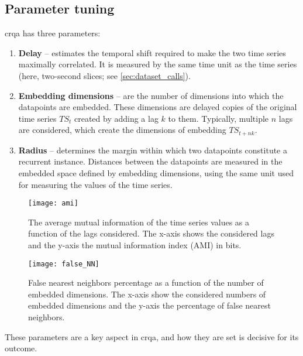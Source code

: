 \subsection{Parameter tuning}
\label{subsec:parameters_crqa}

\Ac{crqa} has three parameters:

\begin{enumerate}
	\item \textbf{Delay} -- estimates the temporal shift required to make the two time series maximally correlated.
	It is measured by the same time unit as the time series (here, two-second slices; see \cref{sec:dataset_calls}).
	
	\item \textbf{Embedding dimensions} -- are the number of dimensions into which the datapoints are embedded.
	These dimensions are delayed copies of the original time series $TS_t$ created by adding a lag $k$ to them.
	Typically, multiple $n$ lags are considered, which create the dimensions of embedding $TS_{t + nk}$.
	
	\item \textbf{Radius} -- determines the margin within which two datapoints constitute a recurrent instance.
	Distances between the datapoints are measured in the embedded space defined by embedding dimensions, using the same unit used for measuring the values of the time series.
\end{enumerate}
%
\begin{figure}
	\centering
	\begin{minipage}{.45\linewidth}
		\centering
		\texttt{[image: ami]}
		\caption[Average mutual information of time series as function of lag]
			{The average mutual information of the time series values as a function of the lags considered.
			The x-axis shows the considered lags and the y-axis the mutual information index (AMI) in bits.}
		\label{fig:ami}
	\end{minipage}%
	\hfill
	\begin{minipage}{.45\linewidth}
		\centering
		\texttt{[image: false\_NN]}
		\caption[Embedded dimensions optimization]
			{False nearest neighbors percentage as a function of the number of embedded dimensions.
			The x-axis show the considered numbers of embedded dimensions and the y-axis the percentage of false nearest neighbors.}
		\label{fig:false_nn}
	\end{minipage}	
\end{figure}
%
These parameters are a key aspect in \ac{crqa}, and how they are set is decisive for its outcome.
